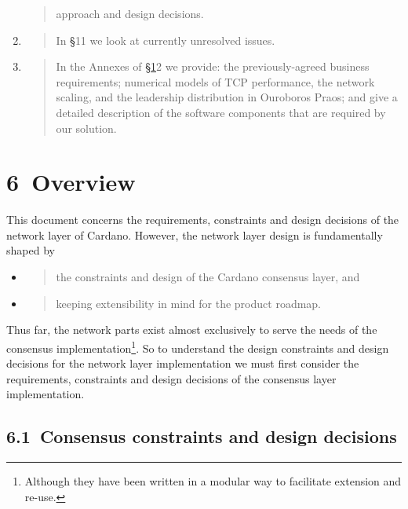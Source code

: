 \documentclass[]{article}
\begin{document}
\begin{enumerate}
\begin{quote}
  approach and design decisions.
  \end{quote}
\item
  \begin{quote}
  In \protect\hyperlink{_7mku7szfvt6w}{{§}}11 we look at currently
  unresolved issues.
  \end{quote}
\item
  \begin{quote}
  In the Annexes of \protect\hyperlink{annexes}{{§1}}2 we provide: the
  previously-agreed business requirements; numerical models of TCP
  performance, the network scaling, and the leadership distribution in
  Ouroboros Praos; and give a detailed description of the software
  components that are required by our solution.
  \end{quote}
\end{enumerate}

\hypertarget{overview}{%
\section{​6​~Overview}\label{overview}}

This document concerns the requirements, constraints and design
decisions of the network layer of Cardano. However, the network layer
design is fundamentally shaped by

\begin{itemize}
\item
  \begin{quote}
  the constraints and design of the Cardano consensus layer, and
  \end{quote}
\item
  \begin{quote}
  keeping extensibility in mind for the product roadmap.
  \end{quote}
\end{itemize}

Thus far, the network parts exist almost exclusively to serve the needs
of the consensus implementation\footnote{Although they have been written
  in a modular way to facilitate extension and re-use.}. So to
understand the design constraints and design decisions for the network
layer implementation we must first consider the requirements,
constraints and design decisions of the consensus layer implementation.

\hypertarget{consensus-constraints-and-design-decisions}{%
\subsection{​6.1​~Consensus constraints and design
decisions}\label{consensus-constraints-and-design-decisions}}
\end{document}
